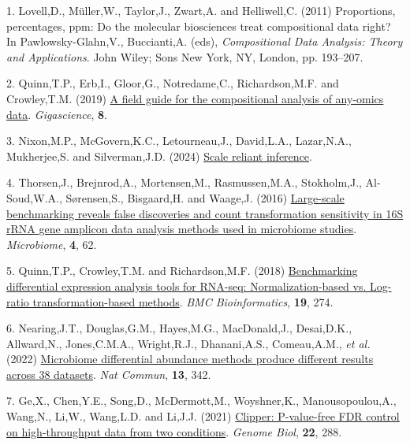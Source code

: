 \documentclass[
]{article}
\newlength{\cslhangindent}
\newenvironment{CSLReferences}[2] %
 {\begin{list}{}{%
  \setlength{\itemindent}{0pt}
  \setlength{\leftmargin}{0pt}
  \setlength{\parsep}{0pt}
  \ifodd #1
   \setlength{\leftmargin}{\cslhangindent}
   \setlength{\itemindent}{-1\cslhangindent}
  \fi
  \setlength{\itemsep}{#2\baselineskip}}}
 {\end{list}}
\begin{document}
\label{refs}
\begin{CSLReferences}{1}{1}
1. Lovell,D., Müller,W., Taylor,J., Zwart,A. and Helliwell,C. (2011)
Proportions, percentages, ppm: Do the molecular biosciences treat
compositional data right? In Pawlowsky-Glahn,V., Buccianti,A. (eds),
\emph{Compositional Data Analysis: Theory and Applications}. John Wiley;
Sons New York, NY, London, pp. 193--207.

2. Quinn,T.P., Erb,I., Gloor,G., Notredame,C., Richardson,M.F. and
Crowley,T.M. (2019) \href{https://doi.org/10.1093/gigascience/giz107}{A
field guide for the compositional analysis of any-omics data}.
\emph{Gigascience}, \textbf{8}.

3. Nixon,M.P., McGovern,K.C., Letourneau,J., David,L.A., Lazar,N.A.,
Mukherjee,S. and Silverman,J.D. (2024)
\href{https://arxiv.org/abs/2201.03616}{Scale reliant inference}.

4. Thorsen,J., Brejnrod,A., Mortensen,M., Rasmussen,M.A., Stokholm,J.,
Al-Soud,W.A., Sørensen,S., Bisgaard,H. and Waage,J. (2016)
\href{https://doi.org/10.1186/s40168-016-0208-8}{Large-scale
benchmarking reveals false discoveries and count transformation
sensitivity in 16{S} r{RNA} gene amplicon data analysis methods used in
microbiome studies}. \emph{Microbiome}, \textbf{4}, 62.

5. Quinn,T.P., Crowley,T.M. and Richardson,M.F. (2018)
\href{https://doi.org/10.1186/s12859-018-2261-8}{Benchmarking
differential expression analysis tools for RNA-seq: Normalization-based
vs. Log-ratio transformation-based methods}. \emph{BMC Bioinformatics},
\textbf{19}, 274.

6. Nearing,J.T., Douglas,G.M., Hayes,M.G., MacDonald,J., Desai,D.K.,
Allward,N., Jones,C.M.A., Wright,R.J., Dhanani,A.S., Comeau,A.M.,
\emph{et al.} (2022)
\href{https://doi.org/10.1038/s41467-022-28034-z}{Microbiome
differential abundance methods produce different results across 38
datasets}. \emph{Nat Commun}, \textbf{13}, 342.

7. Ge,X., Chen,Y.E., Song,D., McDermott,M., Woyshner,K.,
Manousopoulou,A., Wang,N., Li,W., Wang,L.D. and Li,J.J. (2021)
\href{https://doi.org/10.1186/s13059-021-02506-9}{Clipper: P-value-free
FDR control on high-throughput data from two conditions}. \emph{Genome
Biol}, \textbf{22}, 288.


\end{CSLReferences}
\end{document}
